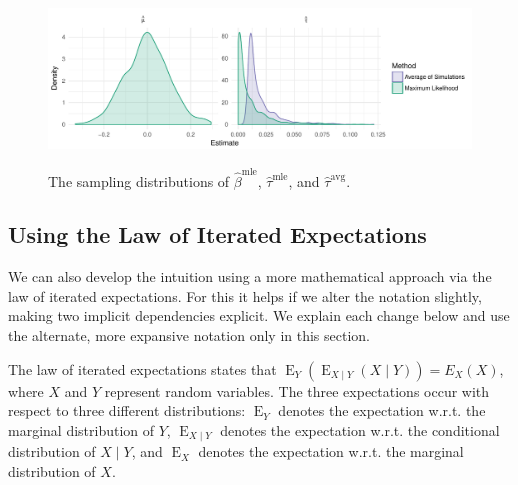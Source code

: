 \documentclass[11pt]{article}
\DeclareMathOperator*{\E}{\text{E}}
\begin{document}
\begin{figure}[h]
\begin{center}
\includegraphics[scale = 0.75]{figs/intuition-sampling.pdf}\\
\vspace{.1in}
\caption{The sampling distributions of $\hat{\beta}^\text{mle}$, $\hat{\tau}^\text{mle}$, and $\hat{\tau}^\text{avg}$.}\label{fig:int-samp}
\end{center}
\end{figure}

\subsection*{Using the Law of Iterated Expectations}

We can also develop the intuition using a more mathematical approach via the law of iterated expectations.
For this it helps if we alter the notation slightly, making two implicit dependencies explicit.
We explain each change below and use the alternate, more expansive notation only in this section.

The law of iterated expectations states that $\E_Y \left( \E_{X \mid Y}(X \mid Y) \right) = E_X(X)$, where $X$ and $Y$ represent random variables.
The three expectations occur with respect to three different distributions: $\E_Y$ denotes the expectation w.r.t. the marginal distribution of $Y$, $\E_{X \mid Y}$ denotes the expectation w.r.t. the conditional distribution of $X \mid Y$, and $\E_X$ denotes the expectation w.r.t. the marginal distribution of $X$.
\end{document}
